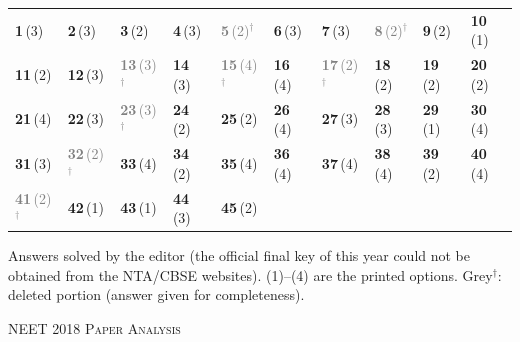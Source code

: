 {\small\setlength{\tabcolsep}{1pt}\renewcommand{\arraystretch}{1.5}
\begin{tabularx}{\linewidth}{@{}*{10}{>{\centering\arraybackslash}X}@{}}\toprule
\textbf{1}\,(3) & \textbf{2}\,(3) & \textbf{3}\,(2) & \textbf{4}\,(3) & \textcolor{gray}{\textbf{5}\,(2)$^{\dagger}$} & \textbf{6}\,(3) & \textbf{7}\,(3) & \textcolor{gray}{\textbf{8}\,(2)$^{\dagger}$} & \textbf{9}\,(2) & \textbf{10}\,(1)\\
\textbf{11}\,(2) & \textbf{12}\,(3) & \textcolor{gray}{\textbf{13}\,(3)$^{\dagger}$} & \textbf{14}\,(3) & \textcolor{gray}{\textbf{15}\,(4)$^{\dagger}$} & \textbf{16}\,(4) & \textcolor{gray}{\textbf{17}\,(2)$^{\dagger}$} & \textbf{18}\,(2) & \textbf{19}\,(2) & \textbf{20}\,(2)\\
\textbf{21}\,(4) & \textbf{22}\,(3) & \textcolor{gray}{\textbf{23}\,(3)$^{\dagger}$} & \textbf{24}\,(2) & \textbf{25}\,(2) & \textbf{26}\,(4) & \textbf{27}\,(3) & \textbf{28}\,(3) & \textbf{29}\,(1) & \textbf{30}\,(4)\\
\textbf{31}\,(3) & \textcolor{gray}{\textbf{32}\,(2)$^{\dagger}$} & \textbf{33}\,(4) & \textbf{34}\,(2) & \textbf{35}\,(4) & \textbf{36}\,(4) & \textbf{37}\,(4) & \textbf{38}\,(4) & \textbf{39}\,(2) & \textbf{40}\,(4)\\
\textcolor{gray}{\textbf{41}\,(2)$^{\dagger}$} & \textbf{42}\,(1) & \textbf{43}\,(1) & \textbf{44}\,(3) & \textbf{45}\,(2) &  &  &  &  & \\\bottomrule\end{tabularx}}\par\smallskip
{\footnotesize Answers solved by the editor (the official final key of this year could not be obtained from the NTA/CBSE websites). (1)--(4) are the printed options. {\color{gray}Grey$^{\dagger}$}: deleted portion (answer given for completeness).\par
}\par
\clearpage
\begin{center}{}\par
{\fontsize{20}{24}\selectfont\color{navy}\scshape NEET 2018 \textperiodcentered{} Paper Analysis}\par
{\color{gilt}}\end{center}
\vspace{4pt}
